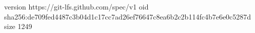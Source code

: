 version https://git-lfs.github.com/spec/v1
oid sha256:de709fed4487c3b04d1c17cc7ad26ef76647c8ea6b2c2b114fc4b7e6e0c5287d
size 1249
